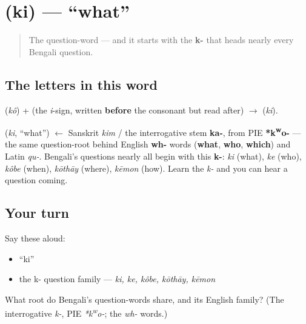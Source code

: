 \section[\texorpdfstring{\bn{কি} (ki)}{কি (ki)}]{ (ki) — \textquotedblleft{}what\textquotedblright{}}

\label{lesson:BN-C02-ki}



\begin{quote}
The question-word — and it starts with the \textbf{k-} that heads nearly every Bengali question.
\end{quote}

\subsection*{The letters in this word}
\textbf{} (\emph{kô}) + \textbf{} (the \emph{i}-sign, written \textbf{before} the consonant but read after) $\to$ \textbf{} (\emph{ki}).

\begin{cousinweb}
\textbf{} (\emph{ki}, \textquotedblleft{}what\textquotedblright{}) $\leftarrow$ Sanskrit \emph{kim} / the interrogative stem \textbf{ka-}, from PIE \textbf{*k\textsuperscript{w}o-} — the same question-root behind English \textbf{wh-} words (\textbf{what}, \textbf{who}, \textbf{which}) and Latin \emph{qu-}. Bengali's questions nearly all begin with this \textbf{k-}: \emph{ki} (what), \emph{ke} (who), \emph{kôbe} (when), \emph{kōthāy} (where), \emph{kēmon} (how). Learn the \emph{k-} and you can hear a question coming.
\end{cousinweb}

\subsection*{Your turn}
Say these aloud:

\begin{itemize}
\raggedright
  \item \textquotedblleft{}ki\textquotedblright{}
  \item the k- question family — \emph{ki, ke, kôbe, kōthāy, kēmon}
\end{itemize}

\begin{tcolorbox}[breakable,colback=teal!4,colframe=teal!35!black,title={Before you move on}]
What root do Bengali's question-words share, and its English family? (The interrogative \emph{k-}, PIE \emph{*k\textsuperscript{w}o-}; the \emph{wh-} words.)
\end{tcolorbox}
